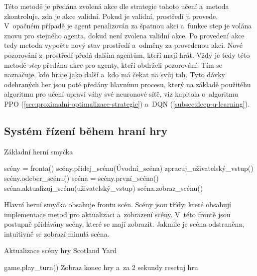 Této metodě je předána zvolená akce dle strategie tohoto učení a~metoda zkontroluje, zda je akce validní.
Pokud je validní, prostředí ji provede.
V~opačném případě je agent penalizován za špatnou akci a~funkce step je volána znovu pro stejného agenta, dokud není zvolena validní akce.
Po provedení akce tedy metoda vypočte nový stav prostředí a~odměny za provedenou akci.
Nové pozorování z~prostředí předá dalším agentům, kteří mají hrát.
Vždy je tedy této metodě \emph{step} předána akce pro agenty, kteří obdrželi pozorování.
Tím se naznačuje, kdo hraje jako další a~kdo má čekat na svůj tah.
Tyto dávky odehraných her jsou poté předány hlavnímu procesu, který na základě použitéhu algoritmu pro učení upraví váhy své neuronové sítě, viz kapitola o~algoritmu PPO (\ref{sec:proximalni-optimalizace-strategie}) a~DQN (\ref{subsec:deep-q-learning}).

\subsection{Systém řízení během hraní hry}

\begin{algorithm}[H]
  \begin{algorithmic}
    \caption{Základní herní smyčka}
    \label{alg:GameController}
      \State scény = fronta()
      \State scény.přidej\_scénu(Úvodní\_scéna)
      \State
        \State zpracuj\_uživatelský\_vstup()
          \State scény.odeber\_scénu()
        \EndIf
        \State scéna = scény.první\_scéna()
        \State scéna.aktualizuj\_scénu(uživatelský\_vstup)
        \State scéna.zobraz\_scénu()
      \EndWhile
  \end{algorithmic}
\end{algorithm}

Hlavní herní smyčka obsahuje frontu scén.
Scény jsou třídy, které obsahují implementace metod pro aktualizaci a~zobrazení scény.
V~této frontě jsou postupně přidávány scény, které se mají zobrazit.
Jakmile je scéna odstraněna, intuitivně se zobrazí minulá scéna.

\begin{algorithm}[H]
  \caption{Aktualizace scény hry Scotland Yard}
  \label{alg:GameScene}
  \begin{algorithmic}
      \State game.play\_turn()
        \State Zobraz konec hry a~za 2 sekundy resetuj hru
      \EndIf
    \EndIf
  \end{algorithmic}
\end{algorithm}

